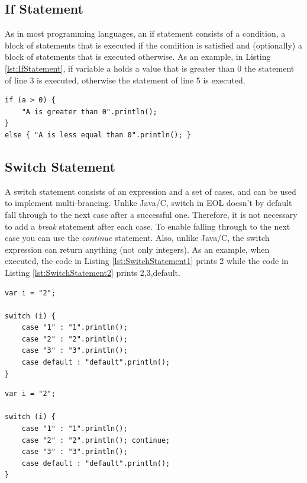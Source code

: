 \subsection{If Statement}

As in most programming languages, an if statement consists of a condition, a block of statements that is executed if the condition is satisfied and (optionally) a block of statements that is executed otherwise. As an example, in Listing \ref{lst:IfStatement}, if variable a holds a value that is greater than 0 the statement of line 3 is executed, otherwise the statement of line 5 is executed.

\begin{lstlisting}[basicstyle=\ttfamily\footnotesize, flexiblecolumns=true, numbers=none, nolol=true, caption=Example illustrating an if statement, label=lst:IfStatement, numbers=left, language=EOL, tabsize=2]
if (a > 0) {
	"A is greater than 0".println();
}
else { "A is less equal than 0".println(); }
\end{lstlisting}

\subsection{Switch Statement}

A switch statement consists of an expression and a set of cases, and can be used to implement multi-brancing. Unlike Java/C, switch in EOL doesn't by default fall through to the next case after a successful one. Therefore, it is not necessary to add a \emph{break} statement after each case. To enable falling through to the next case you can use the \emph{continue} statement. Also, unlike Java/C, the switch expression can return anything (not only integers). As an example, when executed, the code in Listing \ref{lst:SwitchStatement1} prints 2 while the code in Listing \ref{lst:SwitchStatement2} prints 2,3,default.

\begin{lstlisting}[basicstyle=\ttfamily\footnotesize, flexiblecolumns=true, numbers=none, nolol=true, caption=Example illustrating a switch statement, label=lst:SwitchStatement1, numbers=left, language=EOL, tabsize=2]
var i = "2";

switch (i) {
	case "1" : "1".println(); 
	case "2" : "2".println();
	case "3" : "3".println();
	case default : "default".println(); 
}

\end{lstlisting}

\begin{lstlisting}[basicstyle=\ttfamily\footnotesize, flexiblecolumns=true, numbers=none, nolol=true, caption=Example illustrating falling through cases in a switch statement, label=lst:SwitchStatement2, numbers=left, language=EOL, tabsize=2]
var i = "2";

switch (i) {
	case "1" : "1".println(); 
	case "2" : "2".println(); continue;
	case "3" : "3".println();
	case default : "default".println(); 
}

\end{lstlisting}


